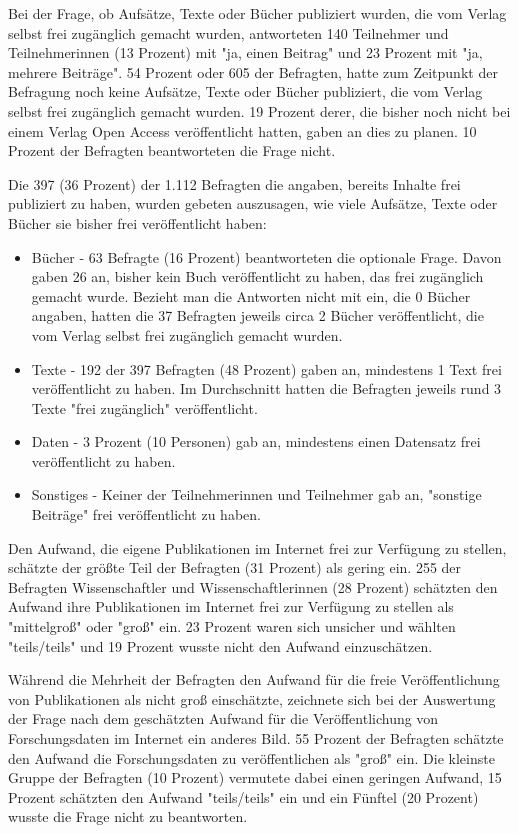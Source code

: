 Bei der Frage, ob Aufsätze, Texte oder Bücher publiziert wurden, die vom Verlag selbst frei zugänglich gemacht wurden, antworteten 140 Teilnehmer und Teilnehmerinnen (13 Prozent) mit "ja, einen Beitrag" und 23 Prozent mit "ja, mehrere Beiträge". 54 Prozent oder 605 der Befragten, hatte zum Zeitpunkt der Befragung noch keine Aufsätze, Texte oder Bücher publiziert, die vom Verlag selbst frei zugänglich gemacht wurden.  19 Prozent derer, die bisher noch nicht bei einem Verlag Open Access veröffentlicht hatten, gaben an dies zu planen. 10 Prozent der Befragten beantworteten die Frage nicht.

Die 397 (36 Prozent) der 1.112 Befragten die angaben, bereits Inhalte frei publiziert zu haben, wurden gebeten auszusagen, wie viele Aufsätze, Texte oder Bücher sie bisher frei veröffentlicht haben:
\begin{itemize}
\item Bücher - 63 Befragte (16 Prozent) beantworteten die optionale Frage. Davon gaben 26 an, bisher kein Buch veröffentlicht zu haben, das frei zugänglich gemacht wurde. Bezieht man die Antworten nicht mit ein, die 0 Bücher angaben, hatten die 37 Befragten jeweils circa 2 Bücher veröffentlicht, die vom Verlag selbst frei zugänglich gemacht wurden.
\item Texte - 192 der 397 Befragten (48 Prozent) gaben an, mindestens 1 Text frei veröffentlicht zu haben. Im Durchschnitt hatten die Befragten jeweils rund 3 Texte "frei zugänglich" veröffentlicht.
\item Daten - 3 Prozent (10 Personen) gab an, mindestens einen Datensatz frei veröffentlicht zu haben.
\item Sonstiges - Keiner der Teilnehmerinnen und Teilnehmer gab an, "sonstige Beiträge" frei veröffentlicht zu haben.
\end{itemize}

Den Aufwand, die eigene Publikationen im Internet frei zur Verfügung zu stellen, schätzte der größte Teil der Befragten (31 Prozent) als gering ein. 255 der Befragten Wissenschaftler und Wissenschaftlerinnen (28 Prozent) schätzten den Aufwand ihre Publikationen im Internet frei zur Verfügung zu stellen als "mittelgroß" oder "groß" ein. 23 Prozent waren sich unsicher und wählten "teils/teils" und 19 Prozent wusste nicht den Aufwand einzuschätzen.

Während die Mehrheit der Befragten den Aufwand für die freie Veröffentlichung von Publikationen als nicht groß einschätzte, zeichnete sich bei der Auswertung der Frage nach dem geschätzten Aufwand für die Veröffentlichung von Forschungsdaten im Internet ein anderes Bild. 55 Prozent der Befragten schätzte den Aufwand die Forschungsdaten zu veröffentlichen als "groß" ein. Die kleinste Gruppe der Befragten (10 Prozent) vermutete dabei einen geringen Aufwand, 15 Prozent schätzten den Aufwand "teils/teils" ein und ein Fünftel (20 Prozent) wusste die Frage nicht zu beantworten.

